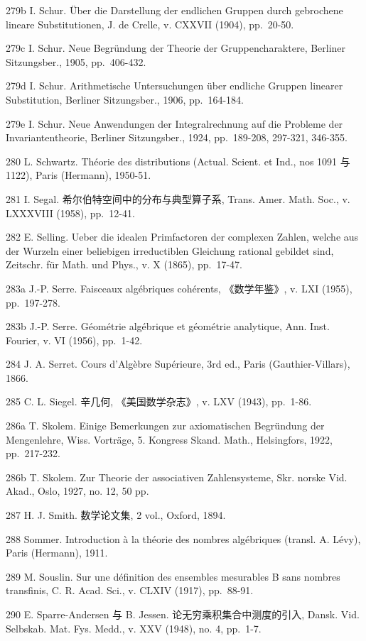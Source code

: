 279b I. Schur. Über die Darstellung der endlichen Gruppen durch gebrochene lineare Substitutionen, J. de Crelle, v. CXXVII (1904), pp.~20-50.

279c I. Schur. Neue Begründung der Theorie der Gruppencharaktere, Berliner Sitzungsber., 1905, pp.~406-432.

279d I. Schur. Arithmetische Untersuchungen über endliche Gruppen linearer Substitution, Berliner Sitzungsber., 1906, pp.~164-184.

279e I. Schur. Neue Anwendungen der Integralrechnung auf die Probleme der Invariantentheorie, Berliner Sitzungsber., 1924, pp.~189-208, 297-321, 346-355.

280 L. Schwartz. Théorie des distributions (Actual. Scient. et Ind., nos 1091 与 1122), Paris (Hermann), 1950-51.

281 I. Segal. 希尔伯特空间中的分布与典型算子系, Trans. Amer. Math. Soc., v. LXXXVIII (1958), pp.~12-41.

282 E. Selling. Ueber die idealen Primfactoren der complexen Zahlen, welche aus der Wurzeln einer beliebigen irreductiblen Gleichung rational gebildet sind, Zeitschr. für Math. und Phys., v. X (1865), pp.~17-47.

283a J.-P. Serre. Faisceaux algébriques cohérents, 《数学年鉴》, v. LXI (1955), pp.~197-278.

283b J.-P. Serre. Géométrie algébrique et géométrie analytique, Ann. Inst. Fourier, v. VI (1956), pp.~1-42.

284 J. A. Serret. Cours d'Algèbre Supérieure, 3rd ed., Paris (Gauthier-Villars), 1866.

285 C. L. Siegel. 辛几何, 《美国数学杂志》, v. LXV (1943), pp.~1-86.

286a T. Skolem. Einige Bemerkungen zur axiomatischen Begründung der Mengenlehre, Wiss. Vorträge, 5. Kongress Skand. Math., Helsingfors, 1922, pp.~217-232.

286b T. Skolem. Zur Theorie der associativen Zahlensysteme, Skr. norske Vid. Akad., Oslo, 1927, no. 12, 50 pp.

287 H. J. Smith. 数学论文集, 2 vol., Oxford, 1894.

288 Sommer. Introduction à la théorie des nombres algébriques (transl. A. Lévy), Paris (Hermann), 1911.

289 M. Souslin. Sur une définition des ensembles mesurables B sans nombres transfinis, C. R. Acad. Sci., v. CLXIV (1917), pp.~88-91.

290 E. Sparre-Andersen 与 B. Jessen. 论无穷乘积集合中测度的引入, Dansk. Vid. Selbskab. Mat. Fys. Medd., v. XXV (1948), no. 4, pp.~1-7.

